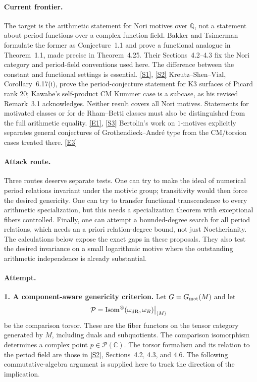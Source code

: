\documentclass[11pt,a4paper]{article}
\newcommand{\Q}{\mathbb{Q}}
\newcommand{\C}{\mathbb{C}}
\newcommand{\sref}[2]{\hyperlink{source:#1:#2}{[S#2]}}
\newcommand{\eref}[2]{\hyperlink{extra:#1:#2}{[E#2]}}
\numberwithin{equation}{section}
\begin{document}
\paragraph{Current frontier.}
The target is the arithmetic statement for Nori motives over $\Q$, not a
statement about period functions over a complex function field. Bakker and
Tsimerman formulate the former as Conjecture~1.1 and prove a functional
analogue in Theorem~1.1, made precise in Theorem~4.25. Their
Sections~4.2--4.3 fix the Nori category and period-field conventions used
here. The difference between the constant and functional settings is
essential. \sref{30006975}{1}, \sref{30006975}{2}
Kreutz--Shen--Vial, Corollary~6.17(i), prove the period-conjecture statement
for K3 surfaces of Picard rank $20$; Kawabe's self-product CM Kummer case
is a subcase, as his revised Remark~3.1 acknowledges. Neither result covers
all Nori motives. Statements for motivated classes or for de Rham--Betti
classes must also be distinguished from the full arithmetic equality.
\eref{30006975}{1}, \sref{30006975}{3}
Bertolin's work on $1$-motives explicitly separates general conjectures
of Grothendieck--Andr\'e type from the CM/torsion cases treated there.
\eref{30006975}{3}

\paragraph{Attack route.}
Three routes deserve separate tests. One can try to make the ideal of
numerical period relations invariant under the motivic group; transitivity
would then force the desired genericity. One can try to transfer functional
transcendence to every arithmetic specialization, but this needs a
specialization theorem with exceptional fibers controlled. Finally, one
can attempt a bounded-degree search for all period relations, which needs
an a priori relation-degree bound, not just Noetherianity. The calculations
below expose the exact gaps in these proposals. They also test the desired
invariance on a small logarithmic motive where the outstanding arithmetic
independence is already substantial.

\paragraph{Attempt.}
\textbf{1. A component-aware genericity criterion.}
Let $G=G_{\rm mot}(M)$ and let
\[
 \mathcal P=\operatorname{Isom}^{\otimes}
       (\omega_{\rm dR},\omega_B)\big|_{\langle M\rangle}
\]
be the comparison torsor. These are the fiber functors on the tensor
category generated by $M$, including duals and subquotients. The comparison
isomorphism determines a complex point $p\in\mathcal P(\C)$.
The torsor formalism and its relation to the period field are those in
\sref{30006975}{2}, Sections~4.2, 4.3, and 4.6. The following commutative-algebra
argument is supplied here to track the direction of the implication.
\end{document}
